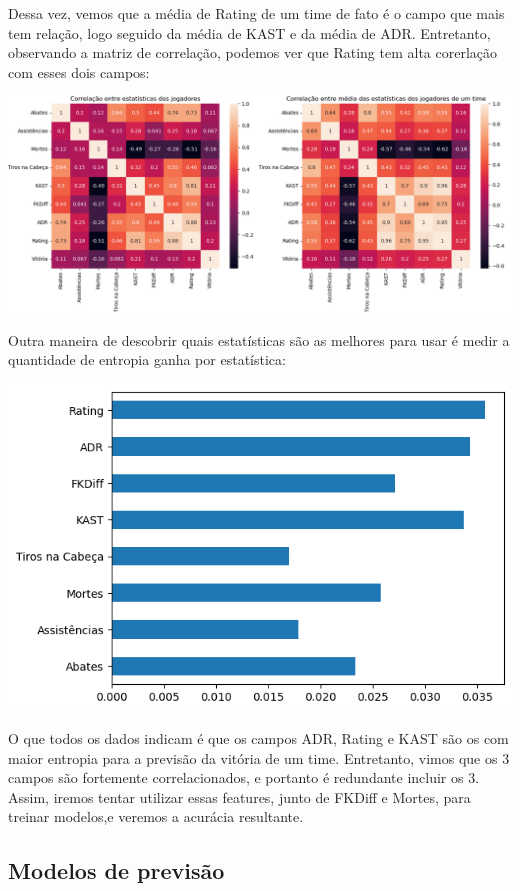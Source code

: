 \documentclass[12pt]{article}
\begin{document}
Dessa vez, vemos que a média de Rating de um time de fato é o campo que mais tem relação, logo seguido da média de KAST e da média de ADR. Entretanto, observando a matriz de correlação, podemos ver que Rating tem alta corerlação com esses dois campos:

\begin{center}
  \includegraphics[width=\linewidth]{./correlacoes.png}
\end{center}

Outra maneira de descobrir quais estatísticas são as melhores para usar é medir a quantidade de entropia ganha por estatística:

\begin{center}
  \includegraphics[width=.6\linewidth]{./information.png}
\end{center}

O que todos os dados indicam é que os campos ADR, Rating e KAST são os com maior entropia para a previsão da vitória de um time. Entretanto, vimos que os 3 campos são fortemente correlacionados, e portanto é redundante incluir os 3. Assim, iremos tentar utilizar essas features, junto de FKDiff e Mortes, para treinar modelos,e veremos a acurácia resultante.

\pagebreak

\subsection{Modelos de previsão}
\end{document}
